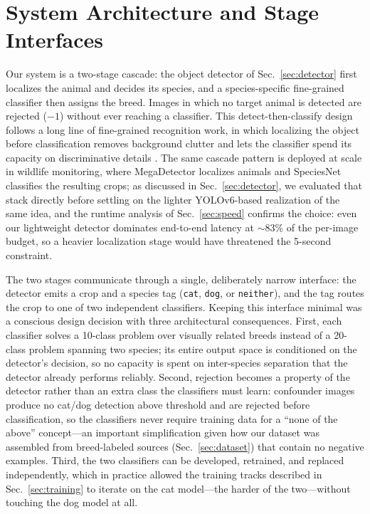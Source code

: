 \section{System Architecture and Stage Interfaces}
\label{sec:architecture}

Our system is a two-stage cascade: the object detector of
Sec.~\ref{sec:detector} first localizes the animal and decides its species,
and a species-specific fine-grained classifier then assigns the breed. Images
in which no target animal is detected are rejected ($-1$) without ever
reaching a classifier. This detect-then-classify design follows a long line
of fine-grained recognition work, in which localizing the object before
classification removes background clutter and lets the classifier spend its
capacity on discriminative details \cite{zhang2014part}. The same cascade
pattern is deployed at scale in wildlife monitoring, where MegaDetector
\cite{megadetector2026} localizes animals and SpeciesNet \cite{speciesnet2025}
classifies the resulting crops; as discussed in Sec.~\ref{sec:detector}, we
evaluated that stack directly before settling on the lighter YOLOv6-based
\cite{li2022yolov6} realization of the same idea, and the runtime analysis of
Sec.~\ref{sec:speed} confirms the choice: even our lightweight detector
dominates end-to-end latency at ${\sim}83\%$ of the per-image budget, so a
heavier localization stage would have threatened the 5-second constraint.

The two stages communicate through a single, deliberately narrow interface:
the detector emits a crop and a species tag (\texttt{cat}, \texttt{dog}, or
\texttt{neither}), and the tag routes the crop to one of two independent
classifiers. Keeping this interface minimal was a conscious design decision
with three architectural consequences. First, each classifier solves a
10-class problem over visually related breeds instead of a 20-class problem
spanning two species; its entire output space is conditioned on the
detector's decision, so no capacity is spent on inter-species separation that
the detector already performs reliably. Second, rejection becomes a property
of the detector rather than an extra class the classifiers must learn:
confounder images produce no cat/dog detection above threshold and are
rejected before classification, so the classifiers never require training
data for a ``none of the above'' concept---an important simplification given
how our dataset was assembled from breed-labeled sources
(Sec.~\ref{sec:dataset}) that contain no negative examples. Third, the two
classifiers can be developed, retrained, and replaced independently, which in
practice allowed the training tracks described in Sec.~\ref{sec:training} to
iterate on the cat model---the harder of the two---without touching the dog
model at all.


